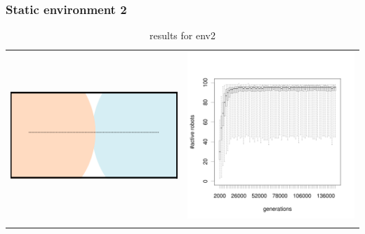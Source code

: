 \documentclass[a4paper,10pt]{article}
\begin{document}
\subsubsection{Static environment 2}
\begin{table}[ht]
\caption{results for env2}
\centering
\begin{tabular}{cc}
\includegraphics[width=\imgSize]{images/5StaticEnv/environments/staticEnv2}&\includegraphics[width=\imgSize]{images/5StaticEnv/alive_staticEnv2}\\
\newline

\end{tabular}
\end{table}
\end{document}
